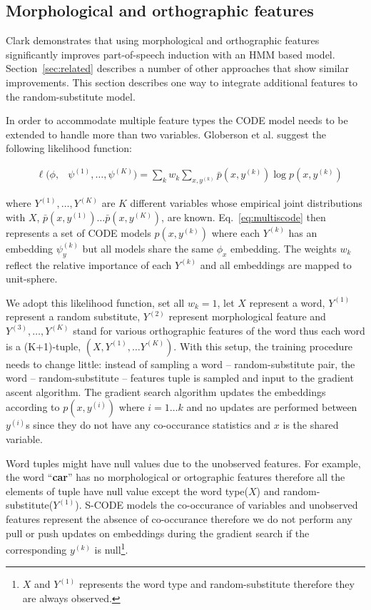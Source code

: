 \subsection{Morphological and orthographic features}
\label{sec:feat}

Clark  demonstrates that
using morphological and orthographic features significantly improves
part-of-speech induction with an HMM based model.
Section~\ref{sec:related} describes a number of other approaches that
show similar improvements.  This section describes one way to
integrate additional features to the random-substitute model.

In order to accommodate multiple feature types the CODE model needs to
be extended to handle more than two variables.  Globerson et
al.  suggest the following
likelihood function:

\begin{eqnarray}
&\ell(\phi,& \psi^{(1)}, \ldots, \psi^{(K)}) = \label{eq:multiscode} \sum_k w_k \sum_{x,y^{(k)}} \bar{p}(x,y^{(k)}) \log p(x,y^{(k)})
\end{eqnarray}

\noindent where $Y^{(1)}, \ldots, Y^{(K)}$ are $K$ different variables
whose empirical joint distributions with $X$,
$\bar{p}(x,y^{(1)})\ldots\bar{p}(x,y^{(K)})$, are known.
Eq.~\ref{eq:multiscode} then represents a set of CODE models
$p(x,y^{(k)})$ where each $Y^{(k)}$ has an embedding $\psi_y^{(k)}$
but all models share the same $\phi_x$ embedding.  The weights $w_k$
reflect the relative importance of each $Y^{(k)}$ and all embeddings
are mapped to unit-sphere.

We adopt this likelihood function, set all $w_k=1$, let $X$ represent
a word, $Y^{(1)}$ represent a random substitute, $Y^{(2)}$ represent
morphological feature and $Y^{(3)}, \ldots, Y^{(K)}$ stand for various
orthographic features of the word thus each word is a (K+1)-tuple,
$(X, Y^{(1)}, \hdots Y^{(K)})$.  With this setup, the training
procedure needs to change little: instead of sampling a word --
random-substitute pair, the word -- random-substitute -- features
tuple is sampled and input to the gradient ascent algorithm.  The
gradient search algorithm updates the embeddings according to
$p(x,y^{(i)})$ where $i=1\hdots k$ and no updates are performed
between $y^{(i)}$s since they do not have any co-occurance statistics
and $x$ is the shared variable.


Word tuples might have null values due to the unobserved features.
For example, the word ``\textbf{car}'' has no morphological or
ortographic features therefore all the elements of tuple have null
value except the word type($X$) and random-substitute($Y^{(1)}$).
S-CODE models the co-occurance of variables and unobserved features
represent the absence of co-occurance therefore we do not perform any
pull or push updates on embeddings during the gradient search if the
corresponding $y^{(k)}$ is null\footnote{$X$ and $Y^{(1)}$ represents
  the word type and random-substitute therefore they are always
  observed.}.

